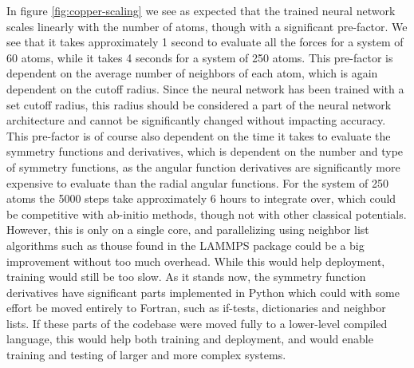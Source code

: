 In figure \ref{fig:copper-scaling} we see as expected that the trained neural network
scales linearly with the number of atoms, though with a significant pre-factor.
We see that it takes approximately 1 second to evaluate all the forces
for a system of 60 atoms, while it takes 4 seconds for a system of 250 atoms.
This pre-factor is dependent on the average number of neighbors
of each atom, which is again dependent on the cutoff radius.
Since the neural network has been trained with a set cutoff radius,
this radius should be considered a part of the neural network architecture
and cannot be significantly changed without impacting accuracy.
This pre-factor is of course also dependent on the time it takes to evaluate
the symmetry functions and derivatives, which is dependent on the number
and type of symmetry functions, as the angular function derivatives are significantly
more expensive to evaluate than the radial angular functions.
For the system of 250 atoms the 5000 steps take approximately 6 hours
to integrate over, which could be competitive with ab-initio methods,
though not with other classical potentials.
However, this is only on a single core, and parallelizing using neighbor list algorithms
such as thouse found in the LAMMPS package could be a big improvement without too much overhead.
While this would help deployment, training would still be too slow.
As it stands now, the symmetry function derivatives have significant parts
implemented in Python which could with some effort be moved entirely to Fortran,
such as if-tests, dictionaries and neighbor lists.
If these parts of the codebase were moved fully to a lower-level compiled
language, this would help both training and deployment, and would enable
training and testing of larger and more complex systems.

